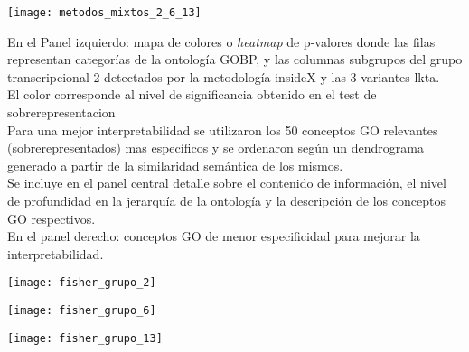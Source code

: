 \begin{center}
\texttt{[image: metodos\_mixtos\_2\_6\_13]}
\label{fig:metodos_mixtos_2_6_13}
\end{center}
En el Panel izquierdo: mapa de colores o \textit{heatmap} de p-valores donde las filas representan categorías de la ontología GOBP, y las columnas subgrupos del grupo transcripcional 2 detectados por la metodología insideX y las 3 variantes lkta.\\
El color corresponde al nivel de significancia obtenido en el test de sobrerepresentacion\\ 
Para una mejor interpretabilidad se utilizaron los 50 conceptos GO relevantes (sobrerepresentados) mas específicos y se ordenaron según un dendrograma generado a partir de la similaridad semántica de los mismos.\\
Se incluye en el panel central detalle sobre el contenido de información, el nivel de profundidad en la jerarquía de la ontología y la descripción de los conceptos GO respectivos.\\
En el panel derecho: conceptos GO de menor especificidad para mejorar la interpretabilidad.
\begin{center}
\texttt{[image: fisher\_grupo\_2]}
\label{fig:fisher_grupo_2}
\end{center}

\begin{center}
\texttt{[image: fisher\_grupo\_6]}
\label{fig:fisher_grupo_6}
\end{center}

\begin{center}
\texttt{[image: fisher\_grupo\_13]}
\label{fig:fisher_grupo_13}
\end{center}



